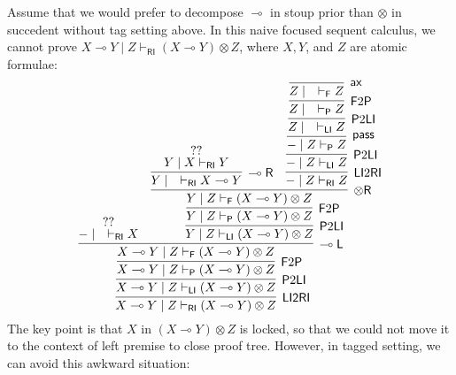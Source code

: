 \documentclass[submission,copyright,creativecommons]{eptcs}
\newcommand{\tr}{\otimes \mathsf{R}}
\newcommand{\lright}{\multimap \mathsf{R}}
\newcommand{\lleft}{\multimap \mathsf{L}}
\newcommand{\pass}{\mathsf{pass}}
\newcommand{\ax}{\mathsf{ax}}
\newcommand{\ot}{\otimes}
\newcommand{\lolli}{\multimap}
\newcommand{\RI}{\mathsf{RI}}
\newcommand{\LI}{\mathsf{LI}}
\newcommand{\Pass}{\mathsf{P}}
\newcommand{\F}{\mathsf{F}}
\begin{document}
Assume that we would prefer to decompose $\lolli$ in stoup prior than $\ot$ in succedent without tag setting above.
In this naive focused sequent calculus, we cannot prove $X \lolli Y \mid Z \vdash_{\RI} (X \lolli Y) \ot Z$, where $X, Y$, and $Z$ are atomic formulae:
\begin{displaymath}
  \infer[\mathsf{\LI 2 \RI}]{X \multimap Y \mid Z \vdash_{\mathsf{RI}} (X\multimap Y) \otimes Z}{
    \infer[\Pass 2 \LI]{X \multimap Y \mid Z \vdash_{\mathsf{LI}} (X\multimap Y) \otimes Z}{
      \infer[\F 2 \Pass]{X \multimap Y \mid Z \vdash_{\Pass} (X\multimap Y) \otimes Z}{
        \infer[\lleft]{X \multimap Y \mid Z \vdash_{\F} (X\multimap Y) \otimes Z}{
          \deduce{- \mid \quad \vdash_{\RI} X}{??}
          &
          \infer[\Pass 2 \LI]{Y \mid Z \vdash_{\LI} (X \lolli Y) \ot Z}{
            \infer[\F 2 \Pass]{Y \mid Z \vdash_{\Pass} (X \lolli Y) \ot Z}{
              \infer[\tr]{Y \mid Z \vdash_{\F} (X \lolli Y) \ot Z}{
                \infer[\lright]{Y \mid \quad \vdash_{\RI} X \lolli Y}{
                  \deduce{Y \mid X \vdash_{\RI} Y}{??}
                }
                &
                \infer[\LI 2 \RI]{- \mid Z \vdash_{\RI} Z}{
                  \infer[\Pass 2 \LI]{- \mid Z \vdash_{\LI} Z}{
                    \infer[\pass]{- \mid Z \vdash_{\Pass} Z}{
                      \infer[\Pass 2 \LI]{Z \mid \quad \vdash_{\LI} Z}{
                        \infer[\F 2 \Pass]{Z \mid \quad \vdash_{\Pass} Z}{
                          \infer[\ax]{Z \mid \quad \vdash_{\F} Z}{}
                        }
                      }
                    }
                  }
                }
              }
            }
          }
        }
      }
    }
  }
\end{displaymath}
The key point is that $X$ in $(X \lolli Y) \ot Z$ is locked, so that we could not move it to the context of left premise to close proof tree.
However, in tagged setting, we can avoid this awkward situation:
\end{document}
